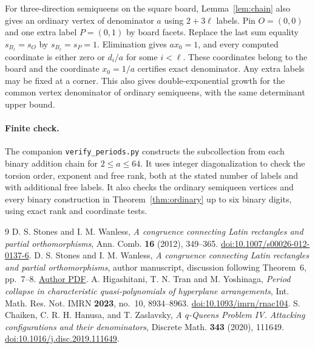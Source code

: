 \documentclass[10pt]{article}
\begin{document}
For three-direction semiqueens on the square board, Lemma~\ref{lem:chain} also gives an ordinary vertex of denominator $a$ using $2+3\ell$ labels. Pin $O=(0,0)$ and one extra label $P=(0,1)$ by board facets. Replace the last sum equality $s_{B_\ell}=s_O$ by $s_{B_\ell}=s_P=1$. Elimination gives $a x_0=1$, and every computed coordinate is either zero or $d_i/a$ for some $i<\ell$. These coordinates belong to the board and the coordinate $x_0=1/a$ certifies exact denominator. Any extra labels may be fixed at a corner. This also gives double-exponential growth for the common vertex denominator of ordinary semiqueens, with the same determinant upper bound.

\paragraph{Finite check.} The companion \texttt{verify\_periods.py} constructs the subcollection from each binary addition chain for $2\le a\le64$. It uses integer diagonalization to check the torsion order, exponent and free rank, both at the stated number of labels and with additional free labels. It also checks the ordinary semiqueen vertices and every binary construction in Theorem~\ref{thm:ordinary} up to six binary digits, using exact rank and coordinate tests.

\small
\begin{thebibliography}{9}
 D. S. Stones and I. M. Wanless, \emph{A congruence connecting Latin rectangles and partial orthomorphisms}, Ann. Comb. \textbf{16} (2012), 349--365. \href{https://doi.org/10.1007/s00026-012-0137-6}{doi:10.1007/s00026-012-0137-6}.
 D. S. Stones and I. M. Wanless, \emph{A congruence connecting Latin rectangles and partial orthomorphisms}, author manuscript, discussion following Theorem~6, pp.~7--8. \href{https://users.monash.edu.au/~iwanless/papers/POLRCong.pdf}{Author PDF}.
 A. Higashitani, T. N. Tran and M. Yoshinaga, \emph{Period collapse in characteristic quasi-polynomials of hyperplane arrangements}, Int. Math. Res. Not. IMRN \textbf{2023}, no.~10, 8934--8963. \href{https://doi.org/10.1093/imrn/rnac104}{doi:10.1093/imrn/rnac104}.
 S. Chaiken, C. R. H. Hanusa, and T. Zaslavsky, \emph{A $q$-Queens Problem IV. Attacking configurations and their denominators}, Discrete Math. \textbf{343} (2020), 111649. \href{https://doi.org/10.1016/j.disc.2019.111649}{doi:10.1016/j.disc.2019.111649}.
\end{thebibliography}
\end{document}
